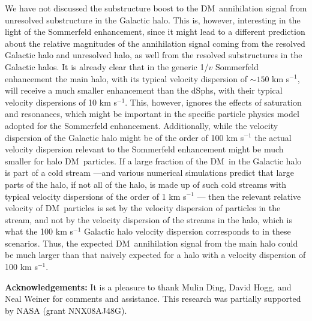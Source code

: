 \documentclass[aps,prd,twocolumn,amsmath,amssymb,floatfix,nofootinbib,10pt]{revtex4}
\newcommand{\DM}{DM}
\newcommand{\dSphs}{dSphs}
\begin{document}
We have not discussed the substructure boost to the \DM\ annihilation
signal from unresolved substructure in the Galactic halo. This is,
however, interesting in the light of the Sommerfeld enhancement, since
it might lead to a different prediction about the relative magnitudes
of the annihilation signal coming from the resolved Galactic halo and
unresolved halo, as well from the resolved substructures in the
Galactic halos. It is already clear that in the generic 1/$v$
Sommerfeld enhancement the main halo, with its typical velocity
dispersion of $\sim\!150$ km s$^{-1}$, will receive a much smaller
enhancement than the \dSphs, with their typical velocity dispersions
of 10 km s$^{-1}$. This, however, ignores the effects of saturation
and resonances, which might be important in the specific particle
physics model adopted for the Sommerfeld enhancement. Additionally,
while the velocity dispersion of the Galactic halo might be of the
order of 100 km s$^{-1}$ the actual velocity dispersion relevant to
the Sommerfeld enhancement might be much smaller for halo \DM\
particles. If a large fraction of the \DM\ in the Galactic halo is
part of a cold stream ---and various numerical simulations predict
that large parts of the halo, if not all of the halo, is made up of
such cold streams with typical velocity dispersions of the order of 1
km s$^{-1}$ \cite{1999MNRAS.307..495H,2003MNRAS.339..834H}--- then the
relevant relative velocity of \DM\ particles is set by the velocity
dispersion of particles in the stream, and not by the velocity
dispersion of the streams in the halo, which is what the 100 km
s$^{-1}$ Galactic halo velocity dispersion corresponds to in these
scenarios. Thus, the expected \DM\ annihilation signal from the main
halo could be much larger than that naively expected for a halo with a
velocity dispersion of 100 km s$^{-1}$.

{\bf Acknowledgements:} It is a pleasure to thank Mulin Ding, David
Hogg, and Neal Weiner for comments and assistance. This research was partially
supported by NASA (grant NNX08AJ48G).




\end{document}
